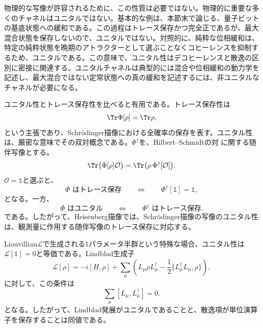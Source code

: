 \documentclass[a4paper,11pt,oneside]{article}
\theoremstyle{definition}
\numberwithin{equation}{section}
\renewcommand{\O}{\mathcal{O}}
\begin{document}
物理的な写像が許容されるために、この性質は必要ではない。物理的に重要な多くのチャネルはユニタルではない。基本的な例は、本節末で論じる、量子ビットの基底状態への緩和である。この過程はトレース保存かつ完全正であるが、最大混合状態を保存しないので、ユニタルではない。対照的に、純粋な位相緩和は、特定の純粋状態を晩期のアトラクターとして選ぶことなくコヒーレンスを抑制するため、ユニタルである。この意味で、ユニタル性はデコヒーレンスと散逸の区別に密接に関連する。ユニタルチャネルは典型的には混合や位相緩和の動力学を記述し、最大混合ではない定常状態への真の緩和を記述するには、非ユニタルなチャネルが必要になる。



ユニタル性とトレース保存性を比べると有用である。トレース保存性は
\begin{equation}
\Tr\Phi[\rho] = \Tr\rho ,
\end{equation}
という主張であり、Schr\"odinger描像における全確率の保存を表す。ユニタル性は、厳密な意味でその双対概念である。$\Phi^\dagger$を、Hilbert--Schmidtの対
に関する随伴写像とする。
\begin{equation}
\Tr\bigl(\Phi[\rho]\O\bigr) = \Tr\bigl(\rho\,\Phi^\dagger[\O]\bigr) .
\end{equation}
$ \O = \mathds{1} $と選ぶと、
\begin{equation}
\Phi \text{ はトレース保存}
\qquad \Longleftrightarrow \qquad
\Phi^\dagger[\mathds{1} ]=\mathds{1}  ,
\end{equation}
となる。一方、
\begin{equation}
\Phi \text{ はユニタル}
\qquad \Longleftrightarrow \qquad
\Phi^\dagger \text{ はトレース保存}.
\end{equation}
である。したがって、Heisenberg描像では、Schr\"odinger描像の写像のユニタル性は、観測量に作用する随伴写像のトレース保存に対応する。



Liouvillian$\mathcal L$で生成される1パラメータ半群という特殊な場合、ユニタル性は$ \mathcal L[\mathds{1} ]=0 $と等価である。Lindblad生成子
\begin{equation}
\mathcal L[\rho]
=
-i[H,\rho]
+
\sum_\mu
\left(
L_\mu \rho L_\mu^\dagger
-\frac12\{L_\mu^\dagger L_\mu,\rho\}
\right) ,
\end{equation}
に対して、この条件は
\begin{equation}
\sum_\mu [L_\mu,L_\mu^\dagger]=0 .
\end{equation}
となる。したがって、Lindblad発展がユニタルであることと、散逸項が単位演算子を保存することは同値である。
\end{document}
